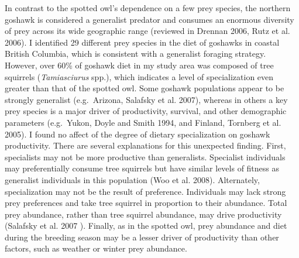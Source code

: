 \documentclass{sfuthesis}
\begin{document}
In contrast to the spotted owl's dependence on a few prey species, the northern goshawk is considered a generalist predator and consumes an enormous diversity of prey across its wide geographic range (reviewed in Drennan 2006, Rutz et al. 2006). I identified 29 different prey species in the diet of goshawks in coastal British Columbia, which is consistent with a generalist foraging strategy. However, over 60\% of goshawk diet in my study area was composed of tree squirrels (\emph{Tamiasciurus} spp.), which indicates a level of specialization even greater than that of the spotted owl. Some goshawk populations appear to be strongly generalist (e.g.~Arizona, Salafsky et al. 2007), whereas in others a key prey species is a major driver of productivity, survival, and other demographic parameters (e.g.~Yukon, Doyle and Smith 1994, and Finland, Tornberg et al. 2005). I found no affect of the degree of dietary specialization on goshawk productivity. There are several explanations for this unexpected finding. First, specialists may not be more productive than generalists. Specialist individuals may preferentially consume tree squirrels but have similar levels of fitness as generalist individuals in this population (Woo et al. 2008). Alternately, specialization may not be the result of preference. Individuals may lack strong prey preferences and take tree squirrel in proportion to their abundance. Total prey abundance, rather than tree squirrel abundance, may drive productivity (Salafsky et al. 2007 ). Finally, as in the spotted owl, prey abundance and diet during the breeding season may be a lesser driver of productivity than other factors, such as weather or winter prey abundance.
\end{document}
